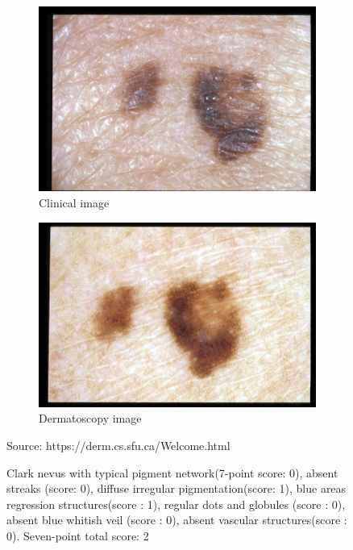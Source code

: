 \begin{figure}
    \centering
    \begin{subfigure}[b]{0.48\linewidth}        %
        \centering
        \includegraphics[width=\linewidth]{images/skin lesion/NEV/Aal005.jpg}
        \caption{Clinical image}
        \label{fig:nev_A}
    \end{subfigure}
    \begin{subfigure}[b]{0.48\linewidth}        %
        \centering
        \includegraphics[width=\linewidth]{images/skin lesion/NEV/Aal006.jpg}
        
        \caption{Dermatoscopy  image}
        \label{fig:nev_B}
    \end{subfigure}
    \caption*{Source: https://derm.cs.sfu.ca/Welcome.html}
    \caption{Clark nevus with typical pigment network(7-point score: 0), absent streaks (score: 0), diffuse irregular pigmentation(score: 1), blue areas regression structures(score : 1), regular dots and globules (score : 0), absent blue whitish veil (score : 0), absent vascular structures(score : 0). Seven-point total score: 2}

    \label{fig:NEV_images}
\end{figure}
